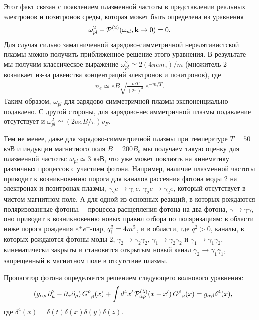 Этот факт связан  с появлением плазменной частоты в представлении реальных электронов и позитронов среды, 
которая может быть определена из уравнения
%
\begin{equation}
\omega_{pl}^2 - {\cal P}^{(2)} (\omega_{pl}, {\mathbf k} \to 0 ) = 0.
\label{eq:omegapl}
\end{equation}
%
Для случая сильно замагниченной зарядово-симметричной нерелятивистской плазмы 
можно получить приближенное решение этого уравнения. В результате мы получим 
классическое выражение $\omega_{pl}^2 \simeq 2(4\pi \alpha n_{e})/m$ (множитель 
2 возникает из-за равенства концентраций электронов и позитронов), где
%
\begin{eqnarray}
n_{e} \simeq eB \sqrt{\frac{m T}{(2\pi)^3}}\,e^{-m/T}.
\label{eq:ne}
\end{eqnarray}
\noindent Таким образом, $\omega_{pl}$ для зарядово-симметричной плазмы экспоненциально подавлено. С другой стороны, для зарядово-несимметричной плазмы подавление отсутствует и $\omega_{pl}^2 \simeq (2\alpha eB/\pi)v_F$.

Тем не менее, даже для зарядово-симметричной плазмы при температуре $T=50$ кэВ 
и индукции магнитного поля $B=200 B_e$ мы получаем такую оценку для плазменной 
частоты: $\omega_{pl} \simeq 3$ кэВ, что уже может повлиять на кинематику 
различных процессов с участием фотона. Например, наличие плазменной частоты 
приводит к возникновению порога для каналов рассеяния фотона моды 2 на 
электронах и позитронах плазмы, $\gamma_2 e \to \gamma_1 e$, $\gamma_2 e \to 
\gamma_2 e$, который отсутствует в чистом магнитном поле. А для одной из 
основных реакций, в которых рождаются поляризованные фотоны, -- процесса 
расщепления фотона на два фотона, $\gamma \to \gamma \gamma$, оно приводит к 
возникновению новых правил отбора по поляризациям: в области ниже порога 
рождения $e^+e^-$-пар, $q^2_{\mbox{\tiny $\|$}} = 4 m^2$, и в области, где $q^2 > 0$, 
каналы, в которых рождаются фотоны моды 2, $\gamma_2 \to \gamma_2 \gamma_2$,
$\gamma_1 \to \gamma_2 \gamma_2$ и $\gamma_1 \to \gamma_1 \gamma_2$, кинематически закрыты и становится открытым новый канал $\gamma_2 \to \gamma_1 \gamma_1$, запрещенный в магнитном поле в отсутствие плазмы.

Пропагатор фотона определяется решением следующего волнового уравнения:
\begin{eqnarray}\label{eq:WaveEq}
	\nonumber
	&& 
	(g_{\alpha \rho} \, \partial_{\mu}^2  -
	\partial_{\alpha}\partial_{\rho}) \, G^{\rho}_{\phantom{x}\beta}(x) + 
	\int d^4 x'\, {\cal P}^{(\lambda)}_{\alpha\rho} (x - x') \, 
	G^{\rho}_{\phantom{x}\beta}(x)
	\nonumber= g_{\alpha\beta}\delta^4(x),
	\label{eq:2}
\end{eqnarray}
где $\delta^4(x)=\delta(t)\delta(x)\delta(y)\delta(z)$. 


